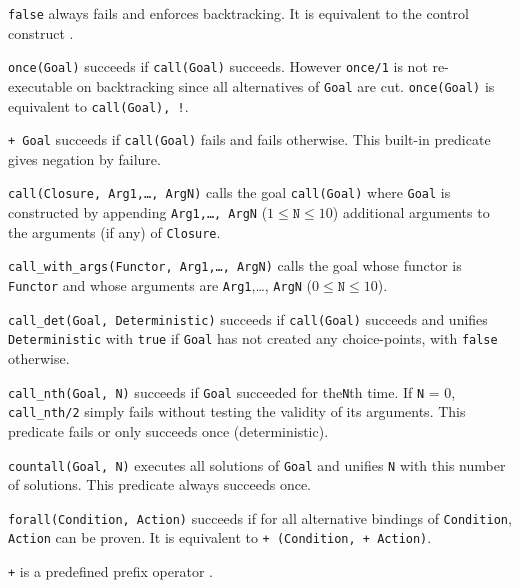 \Description

\texttt{false} always fails and enforces backtracking. It is equivalent to the
 control construct .

\texttt{once(Goal)} succeeds if \texttt{call(Goal)} succeeds. However
\texttt{once/1} is not re-executable on backtracking since all alternatives
of \texttt{Goal} are cut. \texttt{once(Goal)} is equivalent to
\texttt{call(Goal), !}.

\texttt{{\bs}+ Goal} succeeds if \texttt{call(Goal)} fails and fails
otherwise. This built-in predicate gives negation by failure.

\texttt{call(Closure, Arg1,\ldots, ArgN)} calls the goal \texttt{call(Goal)}
where \texttt{Goal} is constructed by appending \texttt{Arg1,\ldots, ArgN}
($1 \leq \texttt{N} \leq 10$) additional arguments to the arguments (if any)
of \texttt{Closure}.

\texttt{call\_with\_args(Functor, Arg1,\ldots, ArgN)} calls the goal
whose functor is \texttt{Functor} and whose arguments are
\texttt{Arg1},\ldots, \texttt{ArgN} ($0 \leq \texttt{N} \leq 10$).

\texttt{call\_det(Goal, Deterministic)} succeeds if \texttt{call(Goal)}
succeeds and unifies \texttt{Deterministic} with \texttt{true} if
\texttt{Goal} has not created any choice-points, with \texttt{false}
otherwise.

\texttt{call\_nth(Goal, N)} succeeds if \texttt{Goal} succeeded for
the\texttt{N}th time. If \texttt{N} = 0, \texttt{call\_nth/2} simply fails
without testing the validity of its arguments. This predicate fails or only
succeeds once (deterministic).

\texttt{countall(Goal, N)} executes all solutions of \texttt{Goal} and
unifies \texttt{N} with this number of solutions. This predicate always
succeeds once.

\texttt{forall(Condition, Action)} succeeds if for all alternative bindings of
\texttt{Condition}, \texttt{Action} can be proven.
It is equivalent to \texttt{{\bs}+ (Condition, {\bs}+ Action)}.


\texttt{{\bs}+} is a predefined prefix operator .

